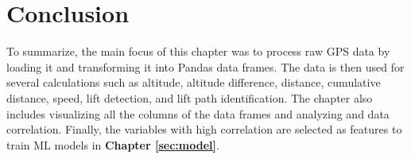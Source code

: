 \section{Conclusion}
\label{sec:data:conclusion}

To summarize, the main focus of this chapter was to process raw GPS data by loading it and transforming it into Pandas data frames. The data is then used for several calculations such as altitude, altitude difference, distance, cumulative distance, speed, lift detection, and lift path identification. The chapter also includes visualizing all the columns of the data frames and analyzing and data correlation. Finally, the variables with high correlation are selected as features to train ML models in
\textbf{Chapter \ref{sec:model}}.

